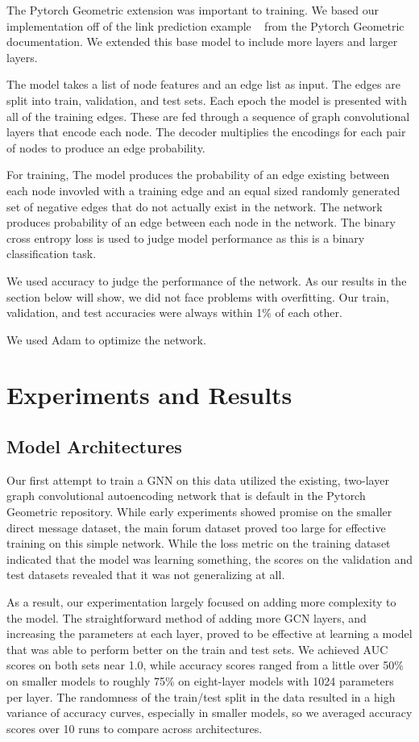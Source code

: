 \documentclass[10pt,twocolumn,letterpaper]{article}
\begin{document}
The Pytorch Geometric extension was important to training. We based our implementation off of the link prediction example ~\cite{pytorch-geometric} from the Pytorch Geometric documentation.
We extended this base model to include more layers and larger layers.

The model takes a list of node features and an edge list as input. The edges are split into train, validation, and test sets.
Each epoch the model is presented with all of the training edges. These are fed through a sequence of graph convolutional layers that encode each node. The decoder multiplies the encodings for each pair of nodes to produce an edge probability.

For training, The model produces the probability of an edge existing between each node invovled with a training edge and an equal sized randomly generated set of negative edges that do not actually exist in the network.
The network produces probability of an edge between each node in the network. The binary cross entropy loss is used to judge model performance as this is a binary classification task.

We used accuracy to judge the performance of the network. As our results in the section below will show, we did not face problems with overfitting. Our train, validation, and test accuracies were always within 1\% of each other.

We used Adam to optimize the network.

\section{Experiments and Results}
\subsection{Model Architectures}

Our first attempt to train a GNN on this data utilized the existing, two-layer graph convolutional autoencoding network that is default in the Pytorch Geometric repository. While early experiments showed promise on the smaller direct message dataset, the main forum dataset proved too large for effective training on this simple network. While the loss metric on the training dataset indicated that the model was learning something, the scores on the validation and test datasets revealed that it was not generalizing at all. 

As a result, our experimentation largely focused on adding more complexity to the model. The straightforward method of adding more GCN layers, and increasing the parameters at each layer, proved to be effective at learning a model that was able to perform better on the train and test sets. We achieved AUC scores on both sets near 1.0, while accuracy scores ranged from a little over 50\% on smaller models to roughly 75\% on eight-layer models with 1024 parameters per layer. The randomness of the train/test split in the data resulted in a high variance of accuracy curves, especially in smaller models, so we averaged accuracy scores over 10 runs to compare across architectures.
\end{document}
